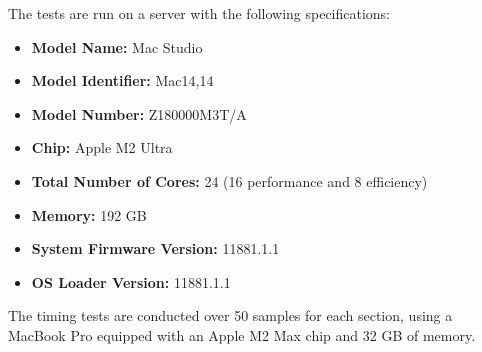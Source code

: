 The tests are run on a server with the following specifications:
\begin{itemize}
    \item \textbf{Model Name:} Mac Studio
    \item \textbf{Model Identifier:} Mac14,14
    \item \textbf{Model Number:} Z180000M3T/A
    \item \textbf{Chip:} Apple M2 Ultra
    \item \textbf{Total Number of Cores:} 24 (16 performance and 8 efficiency)
    \item \textbf{Memory:} 192 GB
    \item \textbf{System Firmware Version:} 11881.1.1
    \item \textbf{OS Loader Version:} 11881.1.1
\end{itemize}
The timing tests are conducted over 50 samples for each section, using a MacBook Pro equipped with an Apple M2 Max chip and 32 GB of memory.

